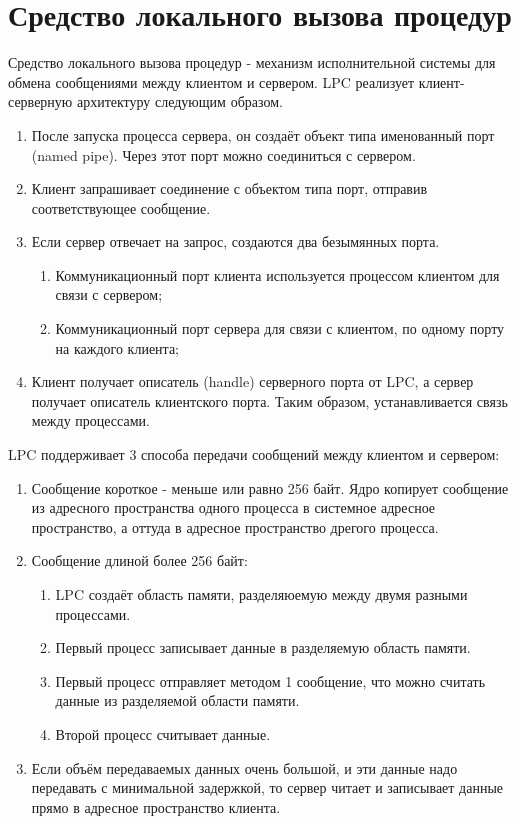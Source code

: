 \documentclass[a4paper]{article}
\begin{document}
\section{Средство локального вызова процедур}
\setcounter{subsection}{0}
Средство локального вызова процедур - механизм исполнительной системы для обмена сообщениями между клиентом и сервером. LPC реализует клиент-серверную архитектуру следующим образом.
\begin{enumerate}
        \item После запуска процесса сервера, он создаёт объект типа именованный порт (named pipe). Через этот порт можно соединиться с сервером.
	\item Клиент запрашивает соединение с объектом типа порт, отправив соответствующее сообщение.
	\item Если сервер отвечает на запрос, создаются два безымянных порта.
	\begin{enumerate}
	\item Коммуникационный порт клиента используется процессом клиентом для связи с сервером;
	\item Коммуникационный порт сервера для связи с клиентом, по одному порту на каждого клиента;
	\end{enumerate}
	\item Клиент получает описатель (handle) серверного порта от LPC, а сервер получает описатель клиентского порта. Таким образом, устанавливается связь между процессами.
\end{enumerate}
LPC поддерживает 3 способа передачи сообщений между клиентом и сервером:
\begin{enumerate}
        \item Сообщение короткое - меньше или равно 256 байт. Ядро копирует сообщение из адресного пространства одного процесса в системное адресное пространство, а оттуда в адресное пространство дрегого процесса.
	\item Сообщение длиной более 256 байт:
	\begin{enumerate}
	        \item LPC создаёт область памяти, разделяюемую между двумя разными процессами.
		\item Первый процесс записывает данные в разделяемую область памяти.
		\item Первый процесс отправляет методом 1 сообщение, что можно считать данные из разделяемой области памяти.
		\item Второй процесс считывает данные.
	\end{enumerate}
	\item Если объём передаваемых данных очень большой, и эти данные надо передавать с минимальной задержкой, то сервер читает и записывает данные прямо в адресное пространство клиента.
\end{enumerate}
\end{document}
